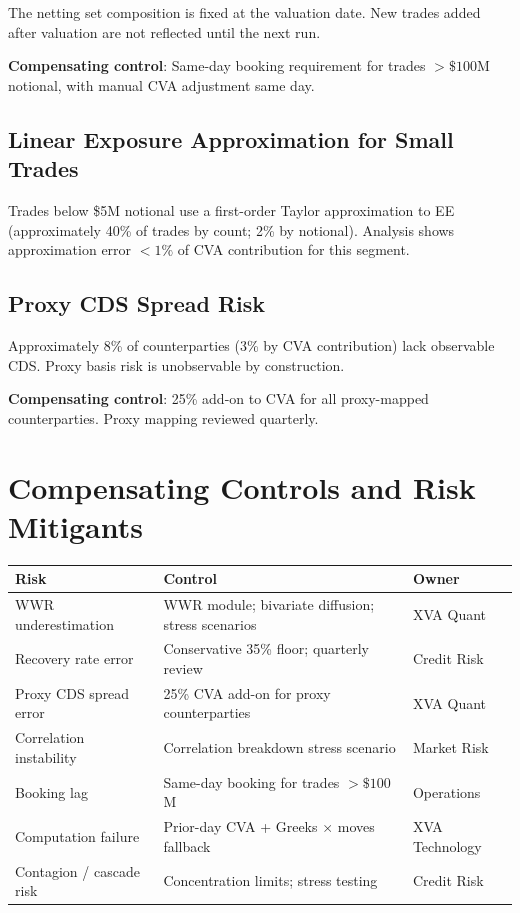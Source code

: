 \documentclass[11pt,a4paper]{article}
\begin{document}
The netting set composition is fixed at the valuation date. New trades added
after valuation are not reflected until the next run.

\textbf{Compensating control}: Same-day booking requirement for trades
$> \$100$M notional, with manual CVA adjustment same day.

\subsection{Linear Exposure Approximation for Small Trades}

Trades below \$5M notional use a first-order Taylor approximation to EE
(approximately 40\% of trades by count; 2\% by notional). Analysis shows
approximation error $< 1\%$ of CVA contribution for this segment.

\subsection{Proxy CDS Spread Risk}

Approximately 8\% of counterparties (3\% by CVA contribution) lack observable
CDS. Proxy basis risk is unobservable by construction.

\textbf{Compensating control}: 25\% add-on to CVA for all proxy-mapped
counterparties. Proxy mapping reviewed quarterly.

\section{Compensating Controls and Risk Mitigants}

\begin{longtable}{@{}lll@{}}
\toprule
\textbf{Risk} & \textbf{Control} & \textbf{Owner} \\
\midrule
\endhead
\bottomrule
\endfoot
WWR underestimation       & WWR module; bivariate diffusion; stress scenarios & XVA Quant \\
Recovery rate error       & Conservative 35\% floor; quarterly review         & Credit Risk \\
Proxy CDS spread error    & 25\% CVA add-on for proxy counterparties           & XVA Quant \\
Correlation instability   & Correlation breakdown stress scenario              & Market Risk \\
Booking lag               & Same-day booking for trades $>\$100$M             & Operations \\
Computation failure       & Prior-day CVA + Greeks $\times$ moves fallback    & XVA Technology \\
Contagion / cascade risk  & Concentration limits; stress testing               & Credit Risk \\
\end{longtable}
\end{document}
